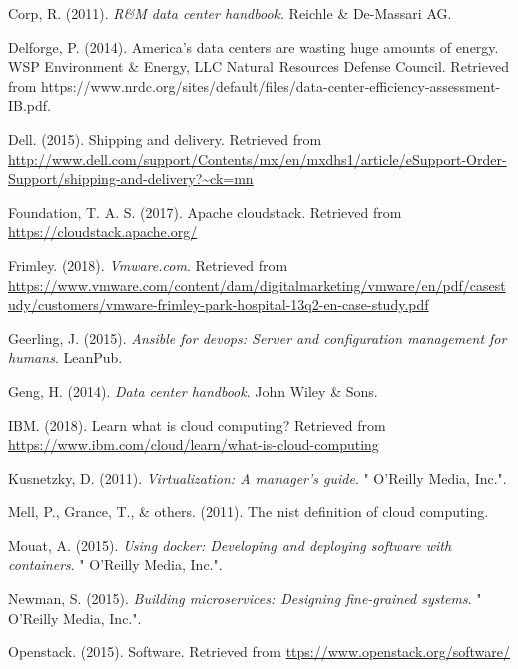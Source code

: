 \documentclass[12pt,twoside]{reedthesis}
\theoremstyle{definition}
\theoremstyle{definition}
\theoremstyle{definition}
\theoremstyle{remark}
\begin{document}
\leavevmode\hypertarget{ref-Cap1_4_PdP}{}%
Corp, R. (2011). \emph{R\&M data center handbook}. Reichle \& De-Massari
AG.

\leavevmode\hypertarget{ref-Cap1_2_PdP}{}%
Delforge, P. (2014). America's data centers are wasting huge amounts of
energy. WSP Environment \& Energy, LLC Natural Resources Defense
Council. Retrieved from
https://www.nrdc.org/sites/default/files/data-center-efficiency-assessment-IB.pdf.

\leavevmode\hypertarget{ref-Cap1_3_PdP}{}%
Dell. (2015). Shipping and delivery. Retrieved from
\url{http://www.dell.com/support/Contents/mx/en/mxdhs1/article/eSupport-Order-Support/shipping-and-delivery?~ck=mn}

\leavevmode\hypertarget{ref-Cap3_5_mT}{}%
Foundation, T. A. S. (2017). Apache cloudstack. Retrieved from
\url{https://cloudstack.apache.org/}

\leavevmode\hypertarget{ref-Cap1_Hospital}{}%
Frimley. (2018). \emph{Vmware.com}. Retrieved from
\url{https://www.vmware.com/content/dam/digitalmarketing/vmware/en/pdf/casestudy/customers/vmware-frimley-park-hospital-13q2-en-case-study.pdf}

\leavevmode\hypertarget{ref-Cap3_8mT}{}%
Geerling, J. (2015). \emph{Ansible for devops: Server and configuration
management for humans}. LeanPub.

\leavevmode\hypertarget{ref-Cap1_5_PdP}{}%
Geng, H. (2014). \emph{Data center handbook}. John Wiley \& Sons.

\leavevmode\hypertarget{ref-ibmcloud}{}%
IBM. (2018). Learn what is cloud computing? Retrieved from
\url{https://www.ibm.com/cloud/learn/what-is-cloud-computing}

\leavevmode\hypertarget{ref-Cap3_1_mT}{}%
Kusnetzky, D. (2011). \emph{Virtualization: A manager's guide}. "
O'Reilly Media, Inc.".

\leavevmode\hypertarget{ref-Cap3_3_mT}{}%
Mell, P., Grance, T., \& others. (2011). The nist definition of cloud
computing.

\leavevmode\hypertarget{ref-Cap4_Docker}{}%
Mouat, A. (2015). \emph{Using docker: Developing and deploying software
with containers}. " O'Reilly Media, Inc.".

\leavevmode\hypertarget{ref-Cap3_Microservicios}{}%
Newman, S. (2015). \emph{Building microservices: Designing fine-grained
systems}. " O'Reilly Media, Inc.".

\leavevmode\hypertarget{ref-Cap3_4_mT}{}%
Openstack. (2015). Software. Retrieved from
\url{ttps://www.openstack.org/software/}
\end{document}
